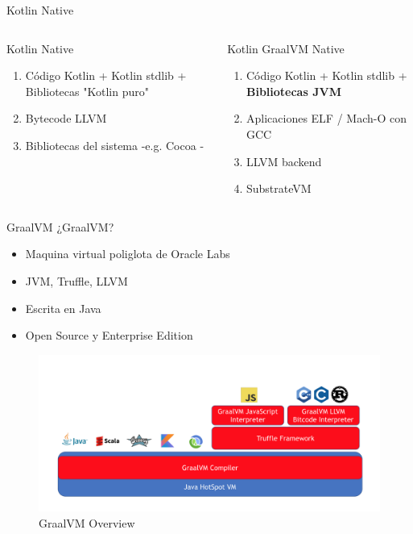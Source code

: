 \documentclass[aspectratio=169]{beamer}
\begin{document}
\begin{frame}{Kotlin Native}
	\begin{columns}[T] %

		\begin{column}[T]{6cm} %
			Kotlin Native
		\begin{enumerate}
		\item Código Kotlin + Kotlin stdlib + Bibliotecas "Kotlin puro"
		\item Bytecode LLVM
		\item Bibliotecas del sistema -e.g. Cocoa -
		\end{enumerate}
		\end{column}
		\begin{column}[T]{6cm} %
        Kotlin GraalVM Native
        \begin{enumerate}
        \item Código Kotlin + Kotlin stdlib + \textbf{Bibliotecas JVM}
        \item Aplicaciones ELF / Mach-O con GCC
        \item LLVM backend
        \item SubstrateVM
        \end{enumerate}

		\end{column}
	\end{columns}
\end{frame}


\begin{frame}{GraalVM}
¿GraalVM?
	\begin{itemize}
		\item Maquina virtual poliglota de Oracle Labs
		\item JVM, Truffle, LLVM
        \item Escrita en Java
        \item Open Source y Enterprise Edition
	\end{itemize}
\end{frame}


\begin{frame}{}
\begin{figure}
	\centering
	\includegraphics[width=\linewidth]{Images/graalvm}
	\caption{GraalVM Overview}
	\label{fig:graalvm}
\end{figure}

\end{frame}
\end{document}
